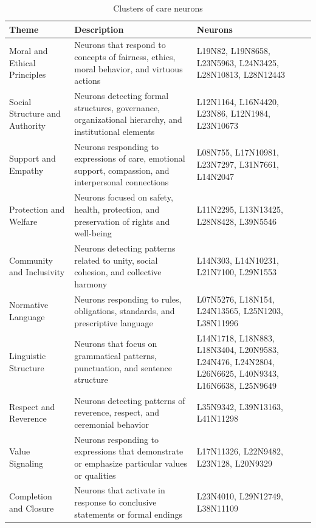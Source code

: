 \documentclass[runninghheads]{llncs}
\begin{document}
\begin{table}[!tb]
    \centering
    \begin{tabular}{|>{\raggedright\arraybackslash}p{3cm}|>{\raggedright\arraybackslash}p{5.5cm}|>{\raggedright\arraybackslash}p{3.5cm}|}
    \hline
        \textbf{Theme} & \textbf{Description} & \textbf{Neurons} \\ \hline
        Moral and Ethical Principles & Neurons that respond to concepts of fairness, ethics, moral behavior, and virtuous actions & L19N82, L19N8658, L23N5963, L24N3425, L28N10813, L28N12443 \\ \hline
        Social Structure and Authority & Neurons detecting formal structures, governance, organizational hierarchy, and institutional elements & L12N1164, L16N4420, L23N86, L12N1984, L23N10673 \\ \hline
        Support and Empathy & Neurons responding to expressions of care, emotional support, compassion, and interpersonal connections & L08N755, L17N10981, L23N7297, L31N7661, L14N2047 \\ \hline
        Protection and Welfare & Neurons focused on safety, health, protection, and preservation of rights and well-being & L11N2295, L13N13425, L28N8428, L39N5546 \\ \hline
        Community and Inclusivity & Neurons detecting patterns related to unity, social cohesion, and collective harmony & L14N303, L14N10231, L21N7100, L29N1553 \\ \hline
        Normative Language & Neurons responding to rules, obligations, standards, and prescriptive language & L07N5276, L18N154, L24N13565, L25N1203, L38N11996 \\ \hline
        Linguistic Structure & Neurons that focus on grammatical patterns, punctuation, and sentence structure & L14N1718, L18N883, L18N3404, L20N9583, L24N476, L24N2804, L26N6625, L40N9343, L16N6638, L25N9649 \\ \hline
        Respect and Reverence & Neurons detecting patterns of reverence, respect, and ceremonial behavior & L35N9342, L39N13163, L41N11298 \\ \hline
        Value Signaling & Neurons responding to expressions that demonstrate or emphasize particular values or qualities & L17N11326, L22N9482, L23N128, L20N9329 \\ \hline
        Completion and Closure & Neurons that activate in response to conclusive statements or formal endings & L23N4010, L29N12749, L38N11109 \\ \hline
    \end{tabular}
     \caption{Clusters of care neurons}
    \label{tab:care}
\end{table}
\end{document}
